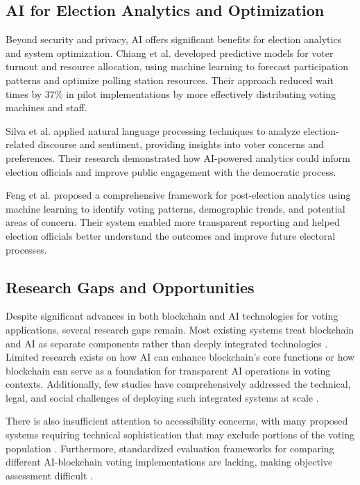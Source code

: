 \documentclass[conference]{IEEEtran}
\begin{document}
\subsection{AI for Election Analytics and Optimization}
Beyond security and privacy, AI offers significant benefits for election analytics and system optimization. Chiang et al. \cite{b18} developed predictive models for voter turnout and resource allocation, using machine learning to forecast participation patterns and optimize polling station resources. Their approach reduced wait times by 37\% in pilot implementations by more effectively distributing voting machines and staff.

Silva et al. \cite{b19} applied natural language processing techniques to analyze election-related discourse and sentiment, providing insights into voter concerns and preferences. Their research demonstrated how AI-powered analytics could inform election officials and improve public engagement with the democratic process.

Feng et al. \cite{b20} proposed a comprehensive framework for post-election analytics using machine learning to identify voting patterns, demographic trends, and potential areas of concern. Their system enabled more transparent reporting and helped election officials better understand the outcomes and improve future electoral processes.

\subsection{Research Gaps and Opportunities}
Despite significant advances in both blockchain and AI technologies for voting applications, several research gaps remain. Most existing systems treat blockchain and AI as separate components rather than deeply integrated technologies \cite{b9}. Limited research exists on how AI can enhance blockchain's core functions or how blockchain can serve as a foundation for transparent AI operations in voting contexts. Additionally, few studies have comprehensively addressed the technical, legal, and social challenges of deploying such integrated systems at scale \cite{b10}.

There is also insufficient attention to accessibility concerns, with many proposed systems requiring technical sophistication that may exclude portions of the voting population \cite{b7}. Furthermore, standardized evaluation frameworks for comparing different AI-blockchain voting implementations are lacking, making objective assessment difficult \cite{b8}.
\end{document}
